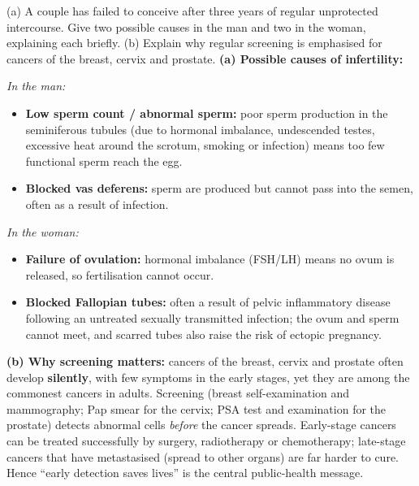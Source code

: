 \documentclass[11pt]{article}
\begin{document}
\begin{exoresolu}
(a) A couple has failed to conceive after three years of regular unprotected intercourse. Give two possible causes in the man and two in the woman, explaining each briefly. (b) Explain why regular screening is emphasised for cancers of the breast, cervix and prostate.
\tcblower
\textbf{(a) Possible causes of infertility:}

\emph{In the man:}
\begin{itemize}
\item \textbf{Low sperm count / abnormal sperm:} poor sperm production in the seminiferous tubules (due to hormonal imbalance, undescended testes, excessive heat around the scrotum, smoking or infection) means too few functional sperm reach the egg.
\item \textbf{Blocked vas deferens:} sperm are produced but cannot pass into the semen, often as a result of infection.
\end{itemize}

\emph{In the woman:}
\begin{itemize}
\item \textbf{Failure of ovulation:} hormonal imbalance (FSH/LH) means no ovum is released, so fertilisation cannot occur.
\item \textbf{Blocked Fallopian tubes:} often a result of pelvic inflammatory disease following an untreated sexually transmitted infection; the ovum and sperm cannot meet, and scarred tubes also raise the risk of ectopic pregnancy.
\end{itemize}

\textbf{(b) Why screening matters:} cancers of the breast, cervix and prostate often develop \textbf{silently}, with few symptoms in the early stages, yet they are among the commonest cancers in adults. Screening (breast self-examination and mammography; Pap smear for the cervix; PSA test and examination for the prostate) detects abnormal cells \emph{before} the cancer spreads. Early-stage cancers can be treated successfully by surgery, radiotherapy or chemotherapy; late-stage cancers that have metastasised (spread to other organs) are far harder to cure. Hence ``early detection saves lives'' is the central public-health message.
\end{exoresolu}
\end{document}
